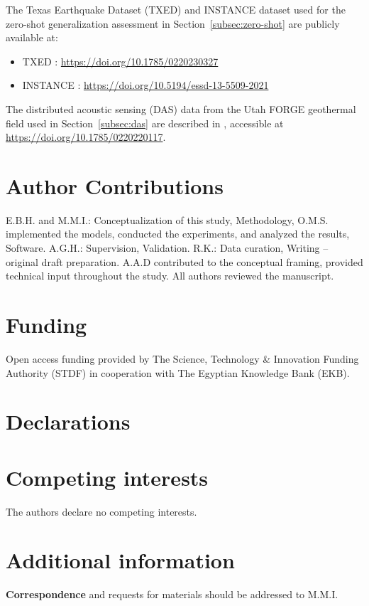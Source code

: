 \documentclass[fleqn,10pt]{wlscirep}
\begin{document}
\noindent The Texas Earthquake Dataset (TXED) and INSTANCE dataset used for the zero-shot generalization assessment in Section~\ref{subsec:zero-shot} are publicly available at:
\begin{itemize}
    \item TXED \cite{txed}: \url{https://doi.org/10.1785/0220230327}
    \item INSTANCE \cite{michelini2021instance}: \url{https://doi.org/10.5194/essd-13-5509-2021}
\end{itemize}

\noindent The distributed acoustic sensing (DAS) data from the Utah FORGE geothermal field used in Section~\ref{subsec:das} are described in \cite{dasdenoising2023}, accessible at \url{https://doi.org/10.1785/0220220117}.





\section*{Author Contributions}

E.B.H. and M.M.I.: Conceptualization of this study, Methodology, O.M.S. implemented the models, conducted the experiments, and analyzed the results, Software. A.G.H.: Supervision, Validation. R.K.: Data curation, Writing -- original draft preparation. A.A.D contributed to the conceptual framing, provided technical input throughout the study. All authors reviewed the manuscript.

\section*{Funding}
Open access funding provided by The Science, Technology \&  Innovation Funding Authority (STDF) in cooperation with The Egyptian Knowledge Bank (EKB).

\section*{Declarations}

\section*{Competing interests}
The authors declare no competing interests.

\section*{Additional information}
\textbf{Correspondence} and requests for materials should be addressed to M.M.I.
\end{document}

